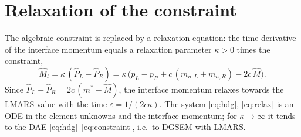 \documentclass[11pt,a4paper]{article}
\begin{document}
\section{Relaxation of the constraint}
The algebraic constraint is replaced by a relaxation equation: the time derivative of the interface momentum equals a
relaxation parameter $\kappa>0$ times the constraint,
\begin{equation}
\hat M_t=\kappa\,(\hat P_L-\hat P_R)=\kappa\,\big(p_L-p_R+c\,(m_{n,L}+m_{n,R})-2c\,\hat M\big).\label{eq:relax}
\end{equation}
Since $\hat P_L-\hat P_R=2c\,(m^*-\hat M)$, the interface momentum relaxes towards the LMARS value with the time $\varepsilon=1/(2c\kappa)$. The
system \eqref{eq:hdg}, \eqref{eq:relax} is an ODE in the element unknowns and the interface momentum; for $\kappa\to\infty$ it tends to the DAE
\eqref{eq:hdg}--\eqref{eq:constraint}, i.e.\ to DGSEM with LMARS.
\end{document}
